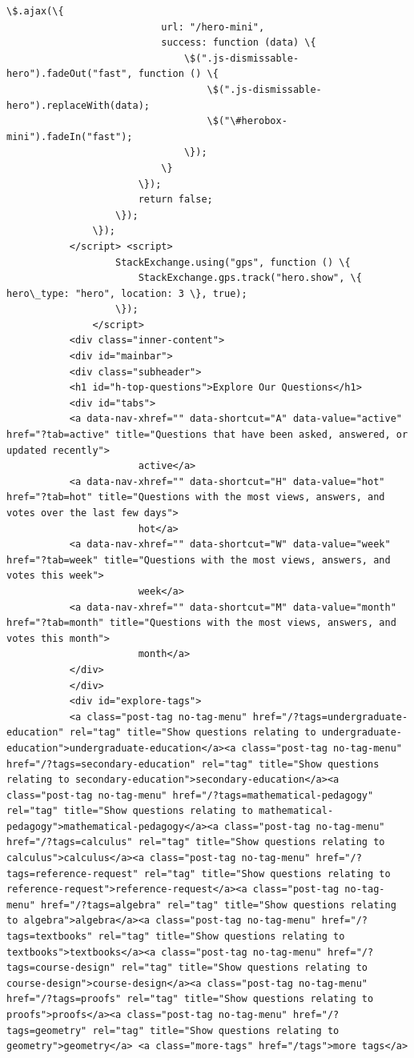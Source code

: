 \documentclass[11pt]{article}
\begin{document}
\begin{Verbatim}[commandchars=\\\{\}]
                       \$.ajax(\{
                           url: "/hero-mini",
                           success: function (data) \{
                               \$(".js-dismissable-hero").fadeOut("fast", function () \{
                                   \$(".js-dismissable-hero").replaceWith(data);
                                   \$("\#herobox-mini").fadeIn("fast");
                               \});
                           \}
                       \});
                       return false;
                   \});
               \});
           </script> <script>
                   StackExchange.using("gps", function () \{
                       StackExchange.gps.track("hero.show", \{ hero\_type: "hero", location: 3 \}, true);
                   \});
               </script>
           <div class="inner-content">
           <div id="mainbar">
           <div class="subheader">
           <h1 id="h-top-questions">Explore Our Questions</h1>
           <div id="tabs">
           <a data-nav-xhref="" data-shortcut="A" data-value="active" href="?tab=active" title="Questions that have been asked, answered, or updated recently">
                       active</a>
           <a data-nav-xhref="" data-shortcut="H" data-value="hot" href="?tab=hot" title="Questions with the most views, answers, and votes over the last few days">
                       hot</a>
           <a data-nav-xhref="" data-shortcut="W" data-value="week" href="?tab=week" title="Questions with the most views, answers, and votes this week">
                       week</a>
           <a data-nav-xhref="" data-shortcut="M" data-value="month" href="?tab=month" title="Questions with the most views, answers, and votes this month">
                       month</a>
           </div>
           </div>
           <div id="explore-tags">
           <a class="post-tag no-tag-menu" href="/?tags=undergraduate-education" rel="tag" title="Show questions relating to undergraduate-education">undergraduate-education</a><a class="post-tag no-tag-menu" href="/?tags=secondary-education" rel="tag" title="Show questions relating to secondary-education">secondary-education</a><a class="post-tag no-tag-menu" href="/?tags=mathematical-pedagogy" rel="tag" title="Show questions relating to mathematical-pedagogy">mathematical-pedagogy</a><a class="post-tag no-tag-menu" href="/?tags=calculus" rel="tag" title="Show questions relating to calculus">calculus</a><a class="post-tag no-tag-menu" href="/?tags=reference-request" rel="tag" title="Show questions relating to reference-request">reference-request</a><a class="post-tag no-tag-menu" href="/?tags=algebra" rel="tag" title="Show questions relating to algebra">algebra</a><a class="post-tag no-tag-menu" href="/?tags=textbooks" rel="tag" title="Show questions relating to textbooks">textbooks</a><a class="post-tag no-tag-menu" href="/?tags=course-design" rel="tag" title="Show questions relating to course-design">course-design</a><a class="post-tag no-tag-menu" href="/?tags=proofs" rel="tag" title="Show questions relating to proofs">proofs</a><a class="post-tag no-tag-menu" href="/?tags=geometry" rel="tag" title="Show questions relating to geometry">geometry</a> <a class="more-tags" href="/tags">more tags</a>

\end{Verbatim}
\end{document}
